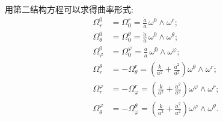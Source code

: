 用第二结构方程可以求得曲率形式:
\begin{align*}
  \Omega_r^0&=\Omega_0^r=\frac{\ddot a}{a}\,\omega^0\wedge\omega^r;\\
  \Omega_\theta^0&=\Omega_0^\theta=\frac{\ddot a}{a}\,\omega^0\wedge\omega^\theta;\\
  \Omega_\varphi^0&=\Omega_0^\varphi=\frac{\ddot a}{a}\,\omega^0\wedge\omega^\varphi;\\
  \Omega_r^\theta&=-\Omega_\theta^r
     =\left(\frac{k}{a^2}+\frac{\dot a^2}{a^2}\right)\omega^\theta\wedge\omega^r;\\
  \Omega_r^\varphi&=-\Omega_\varphi^r
     =\left(\frac{k}{a^2}+\frac{\dot a^2}{a^2}\right)\omega^\varphi\wedge\omega^r;\\
  \Omega_\theta^\varphi&=-\Omega_\varphi^\theta
     =\left(\frac{k}{a^2}+\frac{\dot a^2}{a^2}\right)\omega^\varphi\wedge\omega^\theta.
\end{align*}

